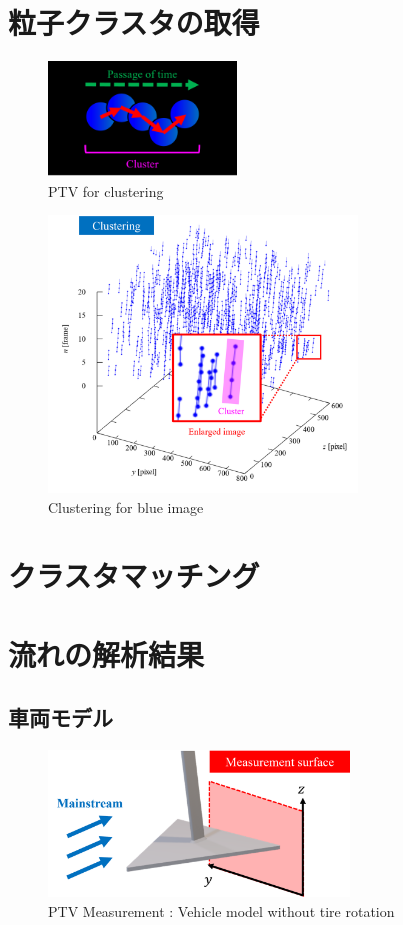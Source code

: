 \documentclass[twocolumn,a4j]{jsarticle}
\begin{document}
\section{粒子クラスタの取得}

\begin{figure}[htbp]
	\centering
	\includegraphics[keepaspectratio, width=50mm]{../images/how_to_get_cluster.png}
	\caption{PTV for clustering}
\end{figure}

\begin{figure}[htbp]
	\centering
	\includegraphics[keepaspectratio, width=82mm]{../images/clustering_for_blue_image.png}
	\caption{Clustering for blue image}
\end{figure}

\section{クラスタマッチング}

\section{流れの解析結果}

\subsection{車両モデル}
\begin{figure}[htbp]
	\centering
	\includegraphics[keepaspectratio, width=80mm]{../images/delta_wing_model.png}
	\caption{PTV Measurement : Vehicle model without tire rotation}
\end{figure}
\end{document}
